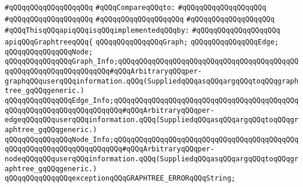 \verb|#qQQqqQQqqQQqqQQqqQQq|\newline
\newline
\verb|#qQQqCompareqQQqto:|\newline
\verb|#qQQqqQQqqQQqqQQqqQQq|\newline
\verb|#qQQqqQQqqQQqqQQqqQQq|\newline
\verb|#qQQqqQQqqQQqqQQqqQQq|\newline
\verb|#qQQqqQQqqQQqqQQqqQQq|\newline
\newline
\verb|#qQQqThisqQQqapiqQQqisqQQqimplementedqQQqby:|\newline
\verb|#qQQqqQQqqQQqqQQqqQQq|\newline
\newline
\verb|apiqQQqGraphtreeqQQq{|\newline
\newline
\verb|qQQqqQQqqQQqqQQqGraph;|\newline
\verb|qQQqqQQqqQQqqQQqEdge;|\newline
\verb|qQQqqQQqqQQqqQQqNode;|\newline
\newline
\verb|qQQqqQQqqQQqqQQqGraph_Info;qQQqqQQqqQQqqQQqqQQqqQQqqQQqqQQqqQQqqQQqqQQqqQQqqQQqqQQqqQQqqQQqqQQq#qQQqArbitraryqQQqper-graphqQQquserqQQqinformation.qQQq(SuppliedqQQqasqQQqargqQQqtoqQQqgraphtree_gqQQqgeneric.)|\newline
\verb|qQQqqQQqqQQqqQQqEdge_Info;qQQqqQQqqQQqqQQqqQQqqQQqqQQqqQQqqQQqqQQqqQQqqQQqqQQqqQQqqQQqqQQqqQQqqQQq#qQQqArbitraryqQQqper-edgeqQQqqQQquserqQQqinformation.qQQq(SuppliedqQQqasqQQqargqQQqtoqQQqgraphtree_gqQQqgeneric.)|\newline
\verb|qQQqqQQqqQQqqQQqNode_Info;qQQqqQQqqQQqqQQqqQQqqQQqqQQqqQQqqQQqqQQqqQQqqQQqqQQqqQQqqQQqqQQqqQQqqQQq#qQQqArbitraryqQQqper-nodeqQQqqQQquserqQQqinformation.qQQq(SuppliedqQQqasqQQqargqQQqtoqQQqgraphtree_gqQQqgeneric.)|\newline
\newline
\verb|qQQqqQQqqQQqqQQqexceptionqQQqGRAPHTREE_ERRORqQQqString;|\newline

